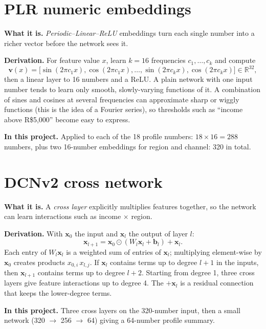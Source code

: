 \documentclass[10pt,a4paper]{article}
\newcommand{\what}[1]{\par\textbf{What it is.} #1}
\newcommand{\here}[1]{\par\textbf{In this project.} #1}
\newcommand{\deriv}{\par\textbf{Derivation.} }
\begin{document}
\section{PLR numeric embeddings}
\what{\emph{Periodic--Linear--ReLU} embeddings turn each single number into a richer vector before the network sees it.}
\deriv For feature value $x$, learn $k=16$ frequencies $c_1,\ldots,c_k$ and compute
\[\mathbf{v}(x)=\big[\sin(2\pi c_1x),\cos(2\pi c_1x),\ldots,\sin(2\pi c_kx),\cos(2\pi c_kx)\big]\in\mathbb{R}^{32},\]
then a linear layer to 16 numbers and a ReLU. A plain network with one input number tends to learn only smooth, slowly-varying functions of it. A combination of sines and cosines at several frequencies can approximate sharp or wiggly functions (this is the idea of a Fourier series), so thresholds such as ``income above R\$5,000'' become easy to express.
\here{Applied to each of the 18 profile numbers: $18\times16=288$ numbers, plus two 16-number embeddings for region and channel: 320 in total.}

\section{DCNv2 cross network}\label{sec:dcn}
\what{A \emph{cross layer} explicitly multiplies features together, so the network can learn interactions such as income $\times$ region.}
\deriv With $\mathbf{x}_0$ the input and $\mathbf{x}_l$ the output of layer $l$:
\[\mathbf{x}_{l+1}=\mathbf{x}_0\odot(W_l\mathbf{x}_l+\mathbf{b}_l)+\mathbf{x}_l.\]
Each entry of $W_l\mathbf{x}_l$ is a weighted sum of entries of $\mathbf{x}_l$; multiplying element-wise by $\mathbf{x}_0$ creates products $x_{0,i}\,x_{l,j}$. If $\mathbf{x}_l$ contains terms up to degree $l+1$ in the inputs, then $\mathbf{x}_{l+1}$ contains terms up to degree $l+2$. Starting from degree 1, three cross layers give feature interactions up to degree 4. The $+\mathbf{x}_l$ is a residual connection that keeps the lower-degree terms.
\here{Three cross layers on the 320-number input, then a small network (320 $\to$ 256 $\to$ 64) giving a 64-number profile summary.}
\end{document}
